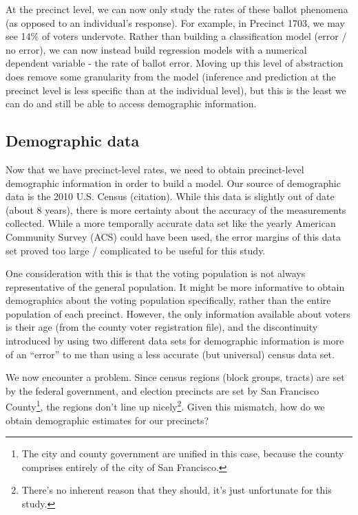 \documentclass[12pt,twoside]{reedthesis}
\theoremstyle{definition}
\theoremstyle{definition}
\theoremstyle{definition}
\theoremstyle{remark}
\begin{document}
At the precinct level, we can now only study the rates of these ballot
phenomena (as opposed to an individual's response). For example, in
Precinct 1703, we may see 14\% of voters undervote. Rather than building
a classification model (error / no error), we can now instead build
regression models with a numerical dependent variable - the rate of
ballot error. Moving up this level of abstraction does remove some
granularity from the model (inference and prediction at the precinct
level is less specific than at the individual level), but this is the
least we can do and still be able to access demographic information.

\hypertarget{demographic-data}{%
\subsection{Demographic data}\label{demographic-data}}

Now that we have precinct-level rates, we need to obtain precinct-level
demographic information in order to build a model. Our source of
demographic data is the 2010 U.S. Census (citation). While this data is
slightly out of date (about 8 years), there is more certainty about the
accuracy of the measurements collected. While a more temporally accurate
data set like the yearly American Community Survey (ACS) could have been
used, the error margins of this data set proved too large / complicated
to be useful for this study.

One consideration with this is that the voting population is not always
representative of the general population. It might be more informative
to obtain demographics about the voting population specifically, rather
than the entire population of each precinct. However, the only
information available about voters is their age (from the county voter
registration file), and the discontinuity introduced by using two
different data sets for demographic information is more of an ``error''
to me than using a less accurate (but universal) census data set.

We now encounter a problem. Since census regions (block groups, tracts)
are set by the federal government, and election precincts are set by San
Francisco County\footnote{The city and county government are unified in
  this case, because the county comprises entirely of the city of San
  Francisco.}, the regions don't line up nicely\footnote{There's no
  inherent reason that they should, it's just unfortunate for this
  study.}. Given this mismatch, how do we obtain demographic estimates
for our precincts?
\end{document}
